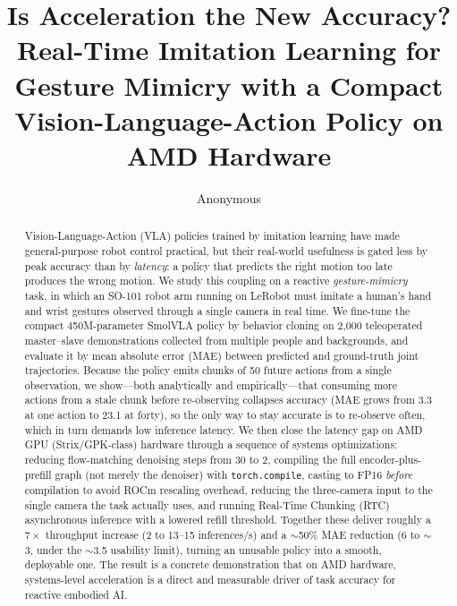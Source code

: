 \documentclass[blind]{gtac}
\title{Is Acceleration the New Accuracy? Real-Time Imitation Learning for
Gesture Mimicry with a Compact Vision-Language-Action Policy on AMD Hardware}
\author{Anonymous}
\begin{document}
\maketitle

\pagestyle{fancy}
\fancyhf{}
\cfoot{\thepage}
\renewcommand{\headrulewidth}{0pt}
\thispagestyle{fancy}

\begin{abstract}
Vision-Language-Action (VLA) policies trained by imitation learning have made
general-purpose robot control practical, but their real-world usefulness is
gated less by peak accuracy than by \emph{latency}: a policy that predicts the
right motion too late produces the wrong motion. We study this coupling on a
reactive \emph{gesture-mimicry} task, in which an SO-101 robot arm running on
LeRobot must imitate a human's hand and wrist gestures observed through a single
camera in real time. We fine-tune the compact 450M-parameter SmolVLA policy by
behavior cloning on 2{,}000 teleoperated master--slave demonstrations collected
from multiple people and backgrounds, and evaluate it by mean absolute error
(MAE) between predicted and ground-truth joint trajectories. Because the policy
emits chunks of 50 future actions from a single observation, we show---both
analytically and empirically---that consuming more actions from a stale chunk
before re-observing collapses accuracy (MAE grows from 3.3 at one action to
23.1 at forty), so the only way to stay accurate is to re-observe often, which
in turn demands low inference latency. We then close the latency gap on AMD
GPU (Strix/GPK-class) hardware through a sequence of systems optimizations:
reducing flow-matching denoising steps from 30 to 2, compiling the full
encoder-plus-prefill graph (not merely the denoiser) with \texttt{torch.compile},
casting to FP16 \emph{before} compilation to avoid ROCm rescaling overhead,
reducing the three-camera input to the single camera the task actually uses, and
running Real-Time Chunking (RTC) asynchronous inference with a lowered refill
threshold. Together these deliver roughly a $7\times$ throughput increase (2 to
13--15 inferences/s) and a $\sim$50\% MAE reduction (6 to $\sim$3, under the
$\sim$3.5 usability limit), turning an unusable policy into a smooth, deployable
one. The result is a concrete demonstration that on AMD hardware, systems-level
acceleration is a direct and measurable driver of task accuracy for reactive
embodied AI.
\end{abstract}
\end{document}
